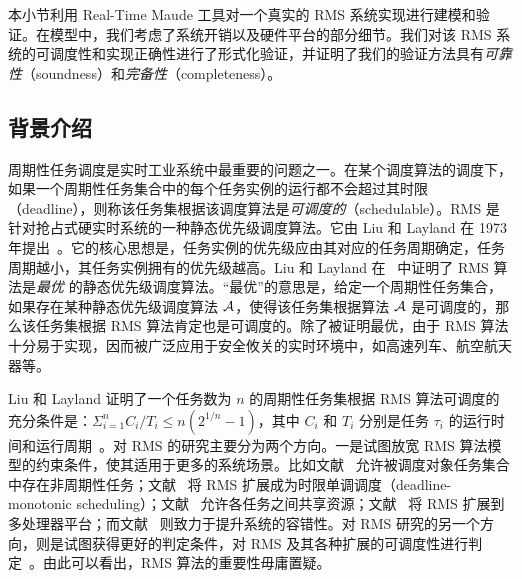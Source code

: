 本小节利用 Real-Time Maude 工具对一个真实的 RMS 系统实现进行建模和验证。在模型中，我们考虑了系统开销以及硬件平台的部分细节。我们对该 RMS 系统的可调度性和实现正确性进行了形式化验证，并证明了我们的验证方法具有\emph{可靠性}（soundness）和\emph{完备性}（completeness）。

\subsection{背景介绍}
\label{s:introduction}

周期性任务调度是实时工业系统中最重要的问题之一。在某个调度算法的调度下，如果一个周期性任务集合中的每个任务实例的运行都不会超过其时限（deadline），则称该任务集根据该调度算法是\emph{可调度的}（schedulable）。RMS 是针对抢占式硬实时系统的一种静态优先级调度算法。它由 Liu 和 Layland 在 1973 年提出~\cite{DBLP:journals/jacm/LiuL73}。它的核心思想是，任务实例的优先级应由其对应的任务周期确定，任务周期越小，其任务实例拥有的优先级越高。Liu 和 Layland 在~ 中证明了 RMS 算法是\emph{最优} 的静态优先级调度算法。“最优”的意思是，给定一个周期性任务集合，如果存在某种静态优先级调度算法 $\mathcal{A}$，使得该任务集根据算法 $\mathcal{A}$ 是可调度的，那么该任务集根据 RMS 算法肯定也是可调度的。除了被证明最优，由于 RMS 算法十分易于实现，因而被广泛应用于安全攸关的实时环境中，如高速列车、航空航天器等。

Liu 和 Layland 证明了一个任务数为 $n$ 的周期性任务集根据 RMS 算法可调度的充分条件是：$\Sigma^n_{i=1}C_i/T_i \le n(2^{1/n}-1)$，其中 $C_i$ 和 $T_i$ 分别是任务 $\tau_i$ 的运行时间和运行周期~\cite{DBLP:journals/jacm/LiuL73}。对 RMS 的研究主要分为两个方向。一是试图放宽 RMS 算法模型的约束条件，使其适用于更多的系统场景。比如文献~ 允许被调度对象任务集合中存在非周期性任务；文献~ 将 RMS 扩展成为时限单调调度（deadline-monotonic scheduling）；文献~ 允许各任务之间共享资源；文献~ 将 RMS 扩展到多处理器平台；而文献~ 则致力于提升系统的容错性。对 RMS 研究的另一个方向，则是试图获得更好的判定条件，对 RMS 及其各种扩展的可调度性进行判定~\cite{DBLP:conf/rtss/LehoczkySD89,DBLP:conf/rtss/KuoM91,DBLP:journals/tc/BiniBB03,DBLP:journals/rts/LopezGDG03,DBLP:journals/tc/BaruahG03}。由此可以看出，RMS 算法的重要性毋庸置疑。

